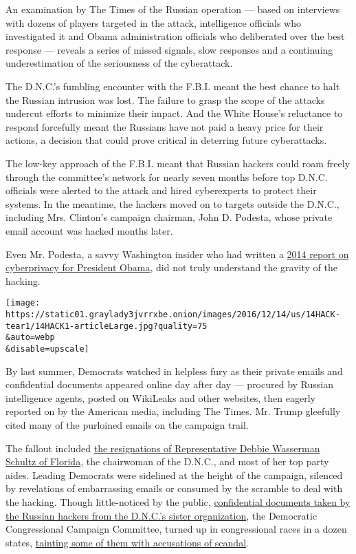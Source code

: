 An examination by The Times of the Russian operation --- based on
interviews with dozens of players targeted in the attack, intelligence
officials who investigated it and Obama administration officials who
deliberated over the best response --- reveals a series of missed
signals, slow responses and a continuing underestimation of the
seriousness of the cyberattack.

The D.N.C.'s fumbling encounter with the F.B.I. meant the best chance to
halt the Russian intrusion was lost. The failure to grasp the scope of
the attacks undercut efforts to minimize their impact. And the White
House's reluctance to respond forcefully meant the Russians have not
paid a heavy price for their actions, a decision that could prove
critical in deterring future cyberattacks.

The low-key approach of the F.B.I. meant that Russian hackers could roam
freely through the committee's network for nearly seven months before
top D.N.C. officials were alerted to the attack and hired cyberexperts
to protect their systems. In the meantime, the hackers moved on to
targets outside the D.N.C., including Mrs. Clinton's campaign chairman,
John D. Podesta, whose private email account was hacked months later.

Even Mr. Podesta, a savvy Washington insider who had written a
\href{https://www.whitehouse.gov/sites/default/files/docs/big_data_privacy_report_may_1_2014.pdf}{2014
report on cyberprivacy for President Obama}, did not truly understand
the gravity of the hacking.

\texttt{[image: https://static01.graylady3jvrrxbe.onion/images/2016/12/14/us/14HACK-tear1/14HACK1-articleLarge.jpg?quality=75\\\&auto=webp\\\&disable=upscale]}

By last summer, Democrats watched in helpless fury as their private
emails and confidential documents appeared online day after day ---
procured by Russian intelligence agents, posted on WikiLeaks and other
websites, then eagerly reported on by the American media, including The
Times. Mr. Trump gleefully cited many of the purloined emails on the
campaign trail.

The fallout included
\href{https://www.nytimes3xbfgragh.onion/2016/07/25/us/politics/debbie-wasserman-schultz-dnc-wikileaks-emails.html}{the
resignations of Representative Debbie Wasserman Schultz of Florida}, the
chairwoman of the D.N.C., and most of her top party aides. Leading
Democrats were sidelined at the height of the campaign, silenced by
revelations of embarrassing emails or consumed by the scramble to deal
with the hacking. Though little-noticed by the public,
\href{https://guccifer2.wordpress.com/2016/08/15/dccc-internal-docs-on-primaries-in-florida/}{confidential
documents taken by the Russian hackers from the D.N.C.'s sister
organization}, the Democratic Congressional Campaign Committee, turned
up in congressional races in a dozen states,
\href{http://www.nytimes3xbfgragh.onion/2016/12/13/us/politics/house-democrats-hacking-dccc.html}{tainting
some of them with accusations of scandal}.

